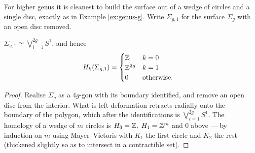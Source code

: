 \documentclass[a4paper]{scrartcl}
\begin{document}
For higher genus it is cleanest to build the surface out of a wedge of circles and a
single disc, exactly as in Example \ref{ex:genus-g}. Write $\Sigma_{g,1}$ for the surface
$\Sigma_g$ with an open disc removed.

\begin{lemma} \label{lem:punctured-surface}
	$\Sigma_{g,1} \simeq \bigvee_{i=1}^{2g}S^1$, and hence
	$$
	H_k(\Sigma_{g,1}) = \begin{cases}\mathbb{Z} & k=0\\ \mathbb{Z}^{2g} & k=1\\ 0 & \text{otherwise.}\end{cases}
	$$
\end{lemma}
\begin{proof}
	Realise $\Sigma_g$ as a $4g$-gon with its boundary identified, and remove an open disc from the interior. What is left deformation retracts radially onto the boundary of the polygon, which after the identifications is $\bigvee_{i=1}^{2g}S^1$. The homology of a wedge of $m$ circles is $H_0 = \mathbb{Z}$, $H_1 = \mathbb{Z}^m$ and $0$ above --- by induction on $m$ using Mayer--Vietoris with $K_1$ the first circle and $K_2$ the rest (thickened slightly so as to intersect in a contractible set).
\end{proof}
\end{document}
